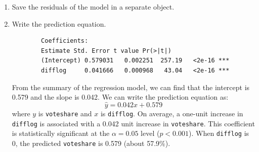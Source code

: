 \documentclass[12pt,letterpaper]{article}
\begin{document}
\begin{enumerate}
		\newpage
		\item Save the residuals of the model in a separate object.	\\
		\begin{doublespace}
			
		\end{doublespace}
		\item Write the prediction equation.\\
		\begin{doublespace}
		\begin{footnotesize}
	\begin{verbatim}
		Coefficients:
		Estimate Std. Error t value Pr(>|t|)    
		(Intercept) 0.579031   0.002251  257.19   <2e-16 ***
		difflog     0.041666   0.000968   43.04   <2e-16 ***
	\end{verbatim}
	\end{footnotesize}
	From the summary of the regression model, we can find that the intercept is 0.579 and the slope is 0.042. We can write the prediction equation as:
	$$\hat{y} = 0.042x + 0.579$$
	where $y$ is \texttt{voteshare} and $x$ is \texttt{difflog}. On average, a one-unit increase in \texttt{difflog} is associated with a 0.042 unit increase in \texttt{voteshare}. This coefficient is statistically significant at the $\alpha = 0.05$ level ($p < 0.001$). When \texttt{difflog} is 0, the predicted \texttt{voteshare} is 0.579 (about 57.9\%).
		\end{doublespace}
	\end{enumerate}
	
\newpage
\end{document}
